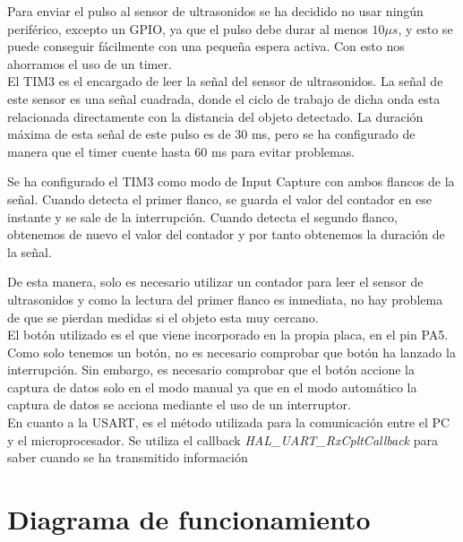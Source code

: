 \documentclass[a4paper, 12pt]{article}
\begin{document}
Para enviar el pulso al sensor de ultrasonidos se ha decidido no usar ningún periférico, excepto un GPIO, ya que el pulso debe durar al menos $10 \mu s$, y esto se puede conseguir fácilmente con una pequeña espera activa. Con esto nos ahorramos el uso de un timer.\\

El TIM3 es el encargado de leer la señal del sensor de ultrasonidos. La señal de este sensor es una señal cuadrada, donde el ciclo de trabajo de dicha onda esta relacionada directamente con la distancia del objeto detectado. La duración máxima de esta señal de este pulso es de 30 ms, pero se ha configurado de manera que el timer cuente hasta 60 ms para evitar problemas.

Se ha configurado el TIM3 como modo de Input Capture con ambos flancos de la señal. Cuando detecta el primer flanco, se guarda el valor del contador en ese instante y se sale de la interrupción. Cuando detecta el segundo flanco, obtenemos de nuevo el valor del contador y por tanto obtenemos la duración de la señal.

De esta manera, solo es necesario utilizar un contador para leer el sensor de ultrasonidos y como la lectura del primer flanco es inmediata, no hay problema de que se pierdan medidas si el objeto esta muy cercano.\\

El botón utilizado es el que viene incorporado en la propia placa, en el pin PA5. Como solo tenemos un botón, no es necesario comprobar que botón ha lanzado la interrupción. Sin embargo, es necesario comprobar que el botón accione la captura de datos solo en el modo manual ya que en el modo automático la captura de datos se acciona mediante el uso de un interruptor.\\

En cuanto a la USART, es el método utilizada para la comunicación entre el PC y el microprocesador. Se utiliza el callback \textit{HAL\_UART\_RxCpltCallback} para saber cuando se ha transmitido información 
\section{Diagrama de funcionamiento}
\end{document}
